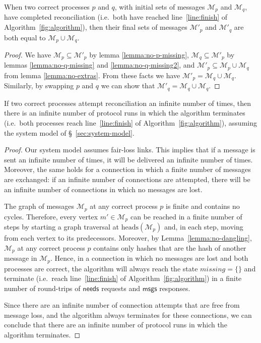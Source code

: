 \documentclass[a4paper,anonymous,USenglish]{lipics-v2019}
\begin{document}
\begin{lemma}\label{lemma:reconcile-equal}
When two correct processes $p$ and $q$, with initial sets of messages $\mathcal{M}_p$ and $\mathcal{M}_q$, have completed reconciliation (i.e.\ both have reached line~\ref{line:finish} of Algorithm~\ref{fig:algorithm}), then their final sets of messages $\mathcal{M}'_p$ and $\mathcal{M}'_q$  are both equal to $\mathcal{M}_p \cup \mathcal{M}_q$.
\end{lemma}
\begin{proof}
We have $\mathcal{M}_p \subseteq \mathcal{M}'_p$ by lemma \ref{lemma:no-p-missing}, $\mathcal{M}_q \subseteq \mathcal{M}'_p$ by lemmas \ref{lemma:no-q-missing} and \ref{lemma:no-q-missing2}, and $\mathcal{M}'_p \subseteq \mathcal{M}_p \cup \mathcal{M}_q$ from lemma \ref{lemma:no-extras}.
From these facts we have $\mathcal{M}'_p = \mathcal{M}_q \cup \mathcal{M}_q$.\\
Similarly, by swapping $p$ and $q$ we can show that $\mathcal{M}'_q = \mathcal{M}_q \cup \mathcal{M}_q$.
\end{proof}

\begin{lemma}\label{lemma:termination}
If two correct processes attempt reconciliation an infinite number of times, then there is an infinite number of protocol runs in which the algorithm terminates (i.e.\ both processes reach line~\ref{line:finish} of Algorithm~\ref{fig:algorithm}), assuming the system model of \S~\ref{sec:system-model}.
\end{lemma}
\begin{proof}
Our system model assumes fair-loss links.
This implies that if a message is sent an infinite number of times, it will be delivered an infinite number of times.
Moreover, the same holds for a connection in which a finite number of messages are exchanged: if an infinite number of connections are attempted, there will be an infinite number of connections in which no messages are lost.

The graph of messages $\mathcal{M}_p$ at any correct process $p$ is finite and contains no cycles.
Therefore, every vertex $m' \in \mathcal{M}_p$ can be reached in a finite number of steps by starting a graph traversal at $\mathrm{heads}(\mathcal{M}_p)$ and, in each step, moving from each vertex to its predecessors.
Moreover, by Lemma~\ref{lemma:no-dangling}, $\mathcal{M}_p$ at any correct process $p$ contains only hashes that are the hash of another message in $\mathcal{M}_p$.
Hence, in a connection in which no messages are lost and both processes are correct, the algorithm will always reach the state $\mathit{missing} = \{\}$ and terminate (i.e.\ reach line~\ref{line:finish} of Algorithm~\ref{fig:algorithm}) in a finite number of round-trips of $\mathsf{needs}$ requests and $\mathsf{msgs}$ responses.

Since there are an infinite number of connection attempts that are free from message loss, and the algorithm always terminates for these connections, we can conclude that there are an infinite number of protocol runs in which the algorithm terminates.
\end{proof}
\end{document}
